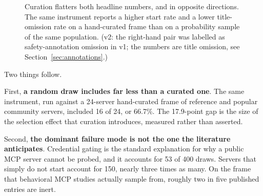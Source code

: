 \documentclass[11pt]{article}
\begin{document}
\begin{figure}[t]
\centering
{}
\caption{Curation flatters both headline numbers, and in opposite directions. The same
instrument reports a higher start rate and a lower title-omission rate on a
hand-curated frame than on a probability sample of the same population. (v2: the
right-hand pair was labelled as safety-annotation omission in v1; the numbers are
title omission, see Section~\ref{sec:annotations}.)}
\label{fig:curation}
\end{figure}

Two things follow.

First, \textbf{a random draw includes far less than a curated one}. The same
instrument, run against a 24-server hand-curated frame of reference and popular
community servers, included 16 of 24, or 66.7\%. The 17.9-point gap is the size of
the selection effect that curation introduces, measured rather than asserted.

Second, \textbf{the dominant failure mode is not the one the literature
anticipates}. Credential gating is the standard explanation for why a public MCP
server cannot be probed, and it accounts for 53 of 400 draws. Servers that simply
do not start account for 150, nearly three times as many. On the frame that
behavioral MCP studies actually sample from, roughly two in five published entries
are inert.
\end{document}
